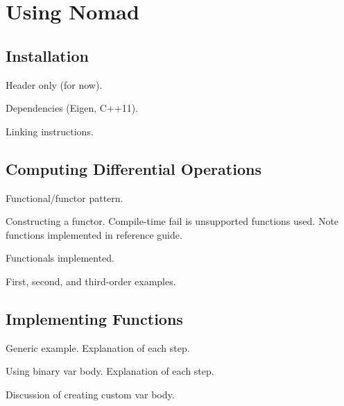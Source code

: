 \chapter{Using Nomad}

\section{Installation}

Header only (for now).  

Dependencies (Eigen, C++11).

Linking instructions.  

\section{Computing Differential Operations}

Functional/functor pattern.

Constructing a functor.  Compile-time fail is unsupported functions
used.  Note functions implemented in reference guide.

Functionals implemented.

First, second, and third-order examples.

\section{Implementing Functions}

Generic example.  Explanation of each step.

Using binary var body.  Explanation of each step.

Discussion of creating custom var body.
